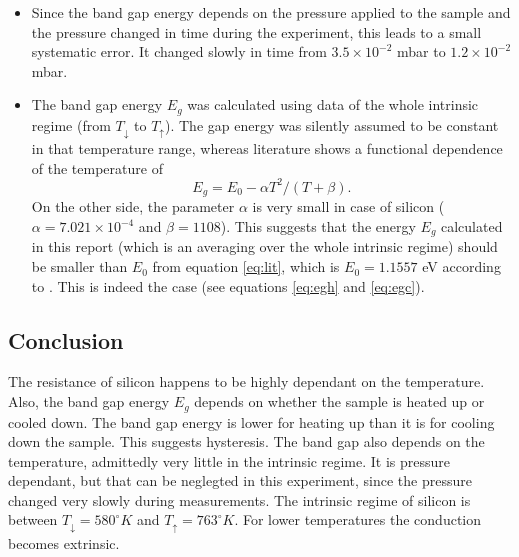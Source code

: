 \documentclass[a4paper]{article}
\begin{document}
\begin{itemize}
\item Since the band gap energy depends on the pressure applied to the sample \cite{benkabou1994} and the pressure changed in time during the experiment, this leads to a small systematic error. It changed slowly in time from $3.5 \times 10^{-2}$ mbar to $1.2\times 10^{-2}$ mbar.
\item The band gap energy $E_g$ was calculated using data of the whole intrinsic regime (from $T_{\downarrow}$ to $T_{\uparrow}$). The gap energy was silently assumed to be constant in that temperature range, whereas literature shows a functional dependence of the temperature of \cite{varshni1967}
\begin{equation}
E_g = E_0 - \alpha T^2/(T + \beta) \label{eq:lit}.
\end{equation}
On the other side, the parameter $\alpha$ is very small in case of silicon ($\alpha = 7.021 \times 10^{-4}$ and $\beta = 1108$). This suggests that the energy $E_g$ calculated in this report (which is an averaging over the whole intrinsic regime) should be smaller than $E_0$ from equation \eqref{eq:lit}, which is $E_0 = 1.1557$ eV according to \cite{varshni1967}. This is indeed the case (see equations \eqref{eq:egh} and \eqref{eq:egc}).
\end{itemize}

\subsection{Conclusion}

The resistance of silicon happens to be highly dependant on the temperature. Also, the band gap energy $E_g$ depends on whether the sample is heated up or cooled down. The band gap energy is lower for heating up than it is for cooling down the sample. This suggests hysteresis. The band gap also depends on the temperature, admittedly very little in the intrinsic regime. It is pressure dependant, but that can be neglegted in this experiment, since the pressure changed very slowly during measurements. The intrinsic regime of silicon is between $T_{\downarrow} = 580^{\circ}K$ and $T_{\uparrow} = 763^{\circ}K$. For lower temperatures the conduction becomes extrinsic.
\end{document}

